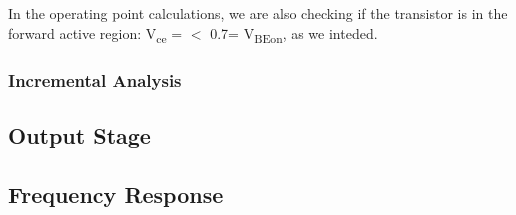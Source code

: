 In the operating point calculations, we are also checking if the transistor is in the forward active region:  V\textsubscript{ce} =  $<$ 0.7= V\textsubscript{BEon}, as we inteded.
\subsubsection{Incremental Analysis}

\subsection{Output Stage}

\subsection{Frequency Response}




